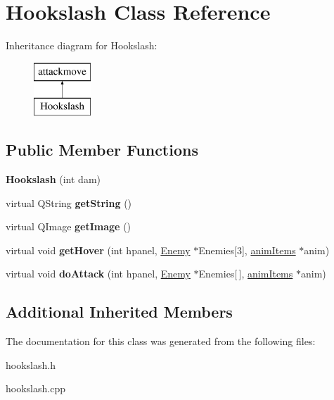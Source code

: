 \hypertarget{class_hookslash}{\section{Hookslash Class Reference}
\label{class_hookslash}
}
Inheritance diagram for Hookslash\-:\begin{figure}[H]
\begin{center}
\leavevmode
\includegraphics[height=2.000000cm]{class_hookslash}
\end{center}
\end{figure}
\subsection*{Public Member Functions}
\begin{DoxyCompactItemize}
\item 
\hypertarget{class_hookslash_a70ac467f48108a4fe26e4db666b217f8}{{\bfseries Hookslash} (int dam)}\label{class_hookslash_a70ac467f48108a4fe26e4db666b217f8}

\item 
\hypertarget{class_hookslash_aaf31aabb624b138d98f3c94fe1c37fcc}{virtual Q\-String {\bfseries get\-String} ()}\label{class_hookslash_aaf31aabb624b138d98f3c94fe1c37fcc}

\item 
\hypertarget{class_hookslash_a65c6e01ac90d1f01139dd08b93aeaa0a}{virtual Q\-Image {\bfseries get\-Image} ()}\label{class_hookslash_a65c6e01ac90d1f01139dd08b93aeaa0a}

\item 
\hypertarget{class_hookslash_ab6a6ca9582c4d8dad26b481292bca6a0}{virtual void {\bfseries get\-Hover} (int hpanel, \hyperlink{class_enemy}{Enemy} $\ast$Enemies\mbox{[}3\mbox{]}, \hyperlink{classanim_items}{anim\-Items} $\ast$anim)}\label{class_hookslash_ab6a6ca9582c4d8dad26b481292bca6a0}

\item 
\hypertarget{class_hookslash_a704f02d57c898d1256c260218fe5c359}{virtual void {\bfseries do\-Attack} (int hpanel, \hyperlink{class_enemy}{Enemy} $\ast$Enemies\mbox{[}$\,$\mbox{]}, \hyperlink{classanim_items}{anim\-Items} $\ast$anim)}\label{class_hookslash_a704f02d57c898d1256c260218fe5c359}

\end{DoxyCompactItemize}
\subsection*{Additional Inherited Members}


The documentation for this class was generated from the following files\-:\begin{DoxyCompactItemize}
\item 
hookslash.\-h\item 
hookslash.\-cpp\end{DoxyCompactItemize}
